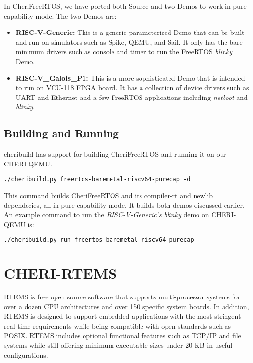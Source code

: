 \documentclass[12pt,twoside,openright,a4paper]{article}
\begin{document}
In CheriFreeRTOS, we have ported both Source and two Demos to work
in pure-capability mode. The two Demos are:

\begin{itemize}
	\item \textbf{RISC-V-Generic:} This is a generic parameterized Demo
	 that can be built and run on simulators such as Spike, QEMU, and
	 Sail. It only has the bare minimum drivers such as console and
		 timer to run the FreeRTOS \textit{blinky} Demo.
	\item \textbf{RISC-V\_Galois\_P1:} This is a more sophisticated Demo
	that is intended to run on VCU-118 FPGA board. It has a collection
	of device drivers such as UART and Ethernet and a few FreeRTOS
	applications including \textit{netboot} and \textit{blinky}.
\end{itemize}

\subsection{Building and Running}

cheribuild has support for building CheriFreeRTOS and running it on our
CHERI-QEMU.

\begin{lstlisting}
./cheribuild.py freertos-baremetal-riscv64-purecap -d
\end{lstlisting}

This command builds CheriFreeRTOS and its compiler-rt and newlib dependecies,
all in pure-capability mode. It builds both demos discussed earlier.\\

An example command to run the \textit{RISC-V-Generic's } \textit{blinky}
demo on CHERI-QEMU is:

\begin{lstlisting}
./cheribuild.py run-freertos-baremetal-riscv64-purecap
\end{lstlisting}


\section{CHERI-RTEMS}
RTEMS is free open source software that supports multi-processor
systems for over a dozen CPU architectures and over 150 specific
system boards. In addition, RTEMS is designed to support embedded
applications with the most stringent real-time requirements while
being compatible with open standards such as POSIX. RTEMS includes
optional functional features such as TCP/IP and file systems while
still offering minimum executable sizes under 20 KB in useful
configurations.\\
\end{document}
